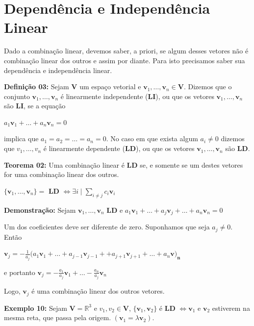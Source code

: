 \section{Dependência e Independência Linear}
Dado a combinação linear, devemos saber, a priori, se algum desses vetores não é combinação linear dos outros e assim por diante. Para isto precisamos saber sua dependência e independência linear.\nocite{camargo2005}

\noindent\textbf{Definição 03:} Sejam $\mathbf{V}$ um espaço vetorial e $\mathbf{v}_1, \ldots, \mathbf{v}_n \in \mathbf{V}$. Dizemos que o conjunto ${\mathbf{v}_1, \ldots, \mathbf{v}_n}$ é linearmente independente (\textbf{LI}), ou que os vetores $\mathbf{v}_1, \ldots, \mathbf{v}_n$ são \textbf{LI}, se a equação

\centerline{$a_1\mathbf{v}_1 + \ldots + a_n\mathbf{v}_n = 0$}

\noindent implica que $a_1 = a_2 = \ldots = a_n = 0$. No caso em que exista algum $a_i \neq 0$ dizemos que ${v_1, \ldots, v_n}$ é linearmente dependente (\textbf{LD}), ou que os vetores $\mathbf{v}_1, \ldots, \mathbf{v}_n$ são \textbf{LD}.

\noindent\textbf{Teorema 02:} Uma combinação linear é \textbf{LD} se, e somente se um destes vetores for uma combinação linear dos outros.

\centerline{$\{\mathbf{v}_1, \ldots,  \mathbf{v}_n \} =$ \textbf{LD} $\iff \exists i \mid \sum_{i \neq j} c_i \mathbf{v}_i$}

\noindent\textbf{Demonstração:} Sejam $\mathbf{v}_1, \ldots, \mathbf{v}_n$ \textbf{LD} e $a_1\mathbf{v}_1 + \ldots + a_j\mathbf{v}_j + \ldots + a_n\mathbf{v}_n = 0$

Um dos coeficientes deve ser diferente de zero. Suponhamos que seja $a_j \neq 0$. Então 

\centerline{$\mathbf{v}_j = -\frac{1}{a_j}(a_1\mathbf{v}_1 + \ldots + a_{j - 1}\mathbf{v}_{j - 1} + + a_{j + 1}\mathbf{v}_{j + 1} + \ldots + a_n\mathbf{v)_n}$}

\centerline{ e portanto $\mathbf{v}_j = -\frac{a_1}{a_j}\mathbf{v}_1 + \ldots -\frac{a_n}{a_j}\mathbf{v}_n$}

Logo, $\mathbf{v}_j$ é uma combinação linear dos outros vetores.

\noindent\textbf{Exemplo 10:} Sejam $\mathbf{V} = \mathbb{R}^3$ e $v_1, v_2 \in \mathbf{V}$, $\{\mathbf{v}_1, \mathbf{v}_2\}$ é \textbf{LD} $\iff \mathbf{v}_1$ e $\mathbf{v}_2$ estiverem na mesma reta, que passa pela origem. $(\mathbf{v}_1 = \lambda\mathbf{v}_2)$.


